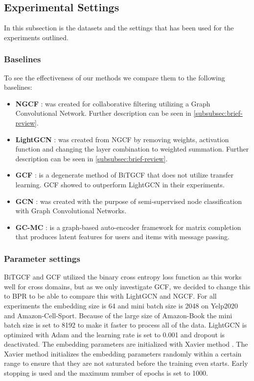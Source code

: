 \subsection{Experimental Settings}

In this subsection is the datasets and the settings that has been used for the experiments outlined.



\subsubsection{Baselines}
To see the effectiveness of our methods we compare them to the following baselines:
\begin{itemize}
    \item \textbf{NGCF} \cite{NGCF_2019}: was created for collaborative filtering utilizing a Graph Convolutional Network. Further description can be seen in \autoref{subsubsec:brief-review}.
    \item \textbf{LightGCN} \cite{lightgcn}: was created from NGCF by removing weights, activation function and changing the layer combination to weighted summation. Further description can be seen in \autoref{subsubsec:brief-review}.
    \item \textbf{GCF} \cite{BiTGCF}: is a degenerate method of BiTGCF that does not utilize transfer learning. GCF showed to outperform LightGCN in their experiments.
    \item \textbf{GCN} \cite{GCN}: was created with the purpose of semi-supervised node classification with Graph Convolutional Networks.
    \item \textbf{GC-MC} \cite{GC_MC}: is a graph-based auto-encoder framework for matrix completion that produces latent features for users and items with message passing.
\end{itemize}

\subsubsection{Parameter settings}
BiTGCF and GCF utilized the binary cross entropy loss function as this works well for cross domains, but as we only investigate GCF, we decided to change this to BPR to be able to compare this with LightGCN and NGCF.
For all experiments the embedding size is 64 and mini batch size is 2048 on Yelp2020 and Amazon-Cell-Sport.
Because of the large size of Amazon-Book the mini batch size is set to 8192 to make it faster to process all of the data.
LightGCN is optimized with Adam \cite{Adam} and the learning rate is set to 0.001 and dropout is deactivated.
The embedding parameters are initialized with Xavier method \cite{Xavier,lightgcn}.
The Xavier method initializes the embedding parameters randomly within a certain range to ensure that they are not saturated before the training even starts.
Early stopping is used and the maximum number of epochs is set to 1000.
